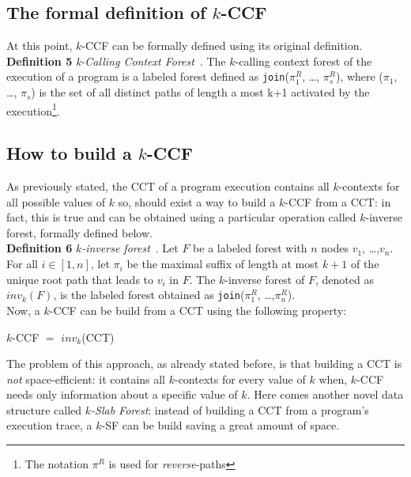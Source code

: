 \documentclass[a4paper,10pt]{report}
\begin{document}
\subsection{The formal definition of $k$-CCF}

At this point, $k$-CCF can be formally defined using its original definition.\\

\textbf{Definition 5} \emph{k-Calling Context Forest}~\cite{kccf}. The $k$-calling context
forest of the execution of a program is a labeled forest defined as
\texttt{join}($\pi_1^R$, \ldots, $\pi_s^R$), where ($\pi_1$, \ldots, $\pi_s$) is the set of
all distinct paths of length a most k+1 activated by the execution\footnote{The notation $\pi^R$ is used for \emph{reverse}-paths}.

\subsection{How to build a $k$-CCF}

As previously stated, the CCT of a program execution contains all $k$-contexts for
all possible values of $k$ so, should exist a way to build a $k$-CCF from a CCT: in fact, this is true and can be obtained using a particular operation called $k$-inverse forest, formally defined below.\\

\textbf{Definition 6} \emph{$k$-inverse forest}~\cite{kccf}. Let $F$ be a labeled forest with $n$ nodes
$v_1$, \ldots ,$v_n$. For all $i \in [1,n]$, let $\pi_i$ be the maximal suffix of length at most $k+1$ of the unique root path that leads to $v_i$ in $F$. The $k$-inverse forest of $F$, denoted as $inv_k(F)$, is the labeled forest obtained as \texttt{join}($\pi_1^R$, \ldots ,$\pi_n^R$).\\[20pt]
Now, a $k$-CCF can be build from a CCT using the following property:
\begin{center}
$k$-CCF $=$ $inv_k$(CCT)
\end{center}

\noindent
The problem of this approach, as already stated before, is that building a CCT
is \emph{not} space-efficient: it contains all $k$-contexts for every value of $k$ when,
$k$-CCF needs only information about a specific value of $k$.
Here comes another novel data structure called \emph{$k$-Slab Forest}:
instead of building a CCT from a program's execution trace, a $k$-SF can be build saving a great amount of space.\\
\end{document}
